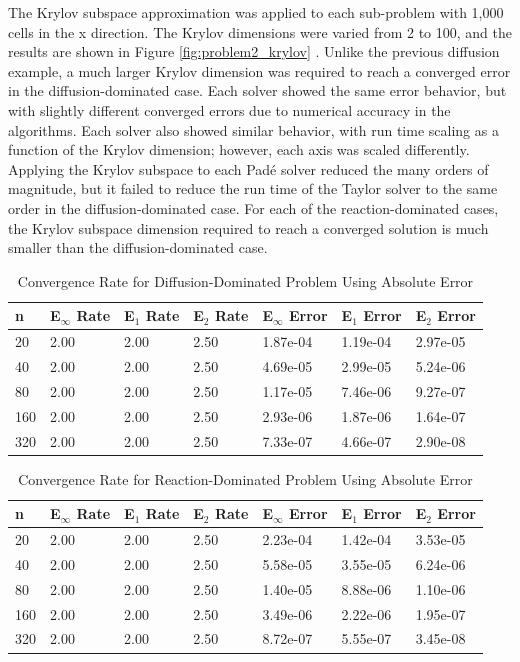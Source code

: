 The Krylov subspace approximation was applied to each sub-problem with 1,000 cells in the x direction. The Krylov dimensions were varied from 2 to 100, and the results are shown in Figure \ref{fig:problem2_krylov} . Unlike the previous diffusion example, a much larger Krylov dimension was required to reach a converged error in the diffusion-dominated case. Each solver showed the same error behavior, but with slightly different converged errors due to numerical accuracy in the algorithms. Each solver also showed similar behavior, with run time scaling as a function of the Krylov dimension; however, each axis was scaled differently. Applying the Krylov subspace to each Pad\'e solver reduced the many orders of magnitude, but it failed to reduce the run time of the Taylor solver to the same order in the diffusion-dominated case. For each of the reaction-dominated cases, the Krylov subspace dimension required to reach a converged solution is much smaller than the diffusion-dominated case. 

\clearpage

\begin{table}[h]
   \caption{\label{tab:diffusion_spatial_convergence_diffusion_dom} Convergence Rate for Diffusion-Dominated Problem Using Absolute Error}
   \centering
   \begin{tabular}{lllllll}
   \hline
    n & E${}_{\infty}$ Rate & E${}_{1}$ Rate & E${}_{2}$ Rate & E${}_{\infty}$ Error & E${}_{1}$ Error & E${}_{2}$ Error\\
   \hline
    20 & 2.00 & 2.00 & 2.50 & 1.87e-04 & 1.19e-04 & 2.97e-05 \\ 
    40 & 2.00 & 2.00 & 2.50 & 4.69e-05 & 2.99e-05 & 5.24e-06 \\ 
    80 & 2.00 & 2.00 & 2.50 & 1.17e-05 & 7.46e-06 & 9.27e-07 \\ 
   160 & 2.00 & 2.00 & 2.50 & 2.93e-06 & 1.87e-06 & 1.64e-07 \\ 
   320 & 2.00 & 2.00 & 2.50 & 7.33e-07 & 4.66e-07 & 2.90e-08 \\ 
   \hline
   \end{tabular}
\end{table}

\begin{table}[h]
   \caption{\label{tab:diffusion_spatial_convergence_reaction_dom} Convergence Rate for Reaction-Dominated Problem Using Absolute Error}
   \centering
   \begin{tabular}{lllllll}
   \hline
    n & E${}_{\infty}$ Rate & E${}_{1}$ Rate & E${}_{2}$ Rate & E${}_{\infty}$ Error & E${}_{1}$ Error & E${}_{2}$ Error\\
   \hline
    20 & 2.00 & 2.00 & 2.50 & 2.23e-04 & 1.42e-04 & 3.53e-05 \\  
    40 & 2.00 & 2.00 & 2.50 & 5.58e-05 & 3.55e-05 & 6.24e-06 \\  
    80 & 2.00 & 2.00 & 2.50 & 1.40e-05 & 8.88e-06 & 1.10e-06 \\  
   160 & 2.00 & 2.00 & 2.50 & 3.49e-06 & 2.22e-06 & 1.95e-07 \\  
   320 & 2.00 & 2.00 & 2.50 & 8.72e-07 & 5.55e-07 & 3.45e-08 \\  
   \hline
   \end{tabular}
\end{table}

